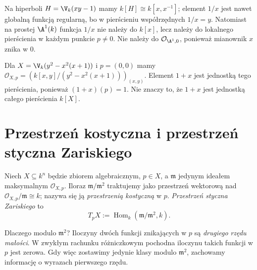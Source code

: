 \begin{przyklad}
Na hiperboli $H=\V_k(xy-1)$ mamy
$k[H]\cong k[x,x^{-1}]$; element $1/x$ jest nawet
globalną funkcją regularną, bo w pierścieniu współrzędnych
$1/x=y$. Natomiast na prostej $\A^1(k)$ funkcja $1/x$
nie należy do $k[x]$, lecz należy do lokalnego pierścienia
w każdym punkcie $p\ne0$. Nie należy do
$\mathcal O_{\A^1,0}$, ponieważ mianownik $x$ znika w $0$.
\end{przyklad}

\begin{przyklad}
Dla $X=\V_k(y^2-x^2(x+1))$ i $p=(0,0)$
mamy $\mathcal O_{X,p}=(k[x,y]/(y^2-x^2(x+1)))_{(x,y)}$.
Element $1+x$ jest jednostką tego pierścienia, ponieważ
$(1+x)(p)=1$. Nie znaczy to, że $1+x$ jest jednostką
całego pierścienia $k[X]$.
\end{przyklad}

\section{Przestrzeń kostyczna i przestrzeń styczna Zariskiego}

\begin{definicja}
\label{def:tangent-zariski}
Niech $X\subseteq k^n$ będzie zbiorem algebraicznym,
$p\in X$, a $\mathfrak m$ jedynym ideałem maksymalnym
$\mathcal O_{X,p}$. Iloraz $\mathfrak m/\mathfrak m^2$
traktujemy jako przestrzeń wektorową nad
$\mathcal O_{X,p}/\mathfrak m\cong k$; nazywa się ją
\emph{przestrzenią kostyczną} w $p$.
\emph{Przestrzeń styczna Zariskiego} to
\[
 T_pX:=\operatorname{Hom}_k(\mathfrak m/\mathfrak m^2,k).
\]
\end{definicja}

Dlaczego modulo $\mathfrak m^2$? Iloczyny dwóch funkcji
znikających w $p$ są \emph{drugiego rzędu małości}.
W zwykłym rachunku różniczkowym pochodna iloczynu
takich funkcji w $p$ jest zerowa. Gdy więc zostawimy
jedynie klasy modulo $\mathfrak m^2$, zachowamy
informację o wyrazach pierwszego rzędu.

